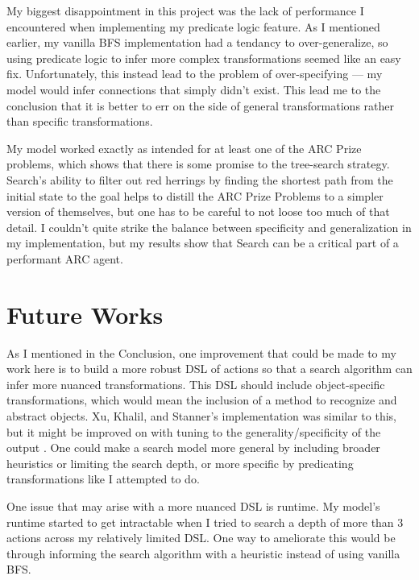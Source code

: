 \documentclass[letterpaper]{article} %
\begin{document}
\bigskip

My biggest disappointment in this project was the lack of performance I encountered when implementing my predicate logic feature. As I mentioned earlier, my vanilla BFS implementation had a tendancy to over-generalize, so using predicate logic to infer more complex transformations seemed like an easy fix. Unfortunately, this instead lead to the problem of over-specifying --- my model would infer connections that simply didn't exist. This lead me to the conclusion that it is better to err on the side of general transformations rather than specific transformations. 

\bigskip

My model worked exactly as intended for at least one of the ARC Prize problems, which shows that there is some promise to the tree-search strategy. Search's ability to filter out red herrings by finding the shortest path from the initial state to the goal helps to distill the ARC Prize Problems to a simpler version of themselves, but one has to be careful to not loose too much of that detail. I couldn't quite strike the balance between specificity and generalization in my implementation, but my results show that Search can be a critical part of a performant ARC agent.

\section{Future Works}
As I mentioned in the Conclusion, one improvement that could be made to my work here is to build a more robust DSL of actions so that a search algorithm can infer more nuanced transformations. This DSL should include object-specific transformations, which would mean the inclusion of a method to recognize and abstract objects. Xu, Khalil, and Stanner's implementation was similar to this, but it might be improved on with tuning to the generality/specificity of the output \cite{Xu_Khalil_Sanner_2023}. One could make a search model more general by including broader heuristics or limiting the search depth, or more specific by predicating transformations like I attempted to do. 

\bigskip

One issue that may arise with a more nuanced DSL is runtime. My model's runtime started to get intractable when I tried to search a depth of more than 3 actions across my relatively limited DSL. One way to ameliorate this would be through informing the search algorithm with a heuristic instead of using vanilla BFS.
\end{document}
